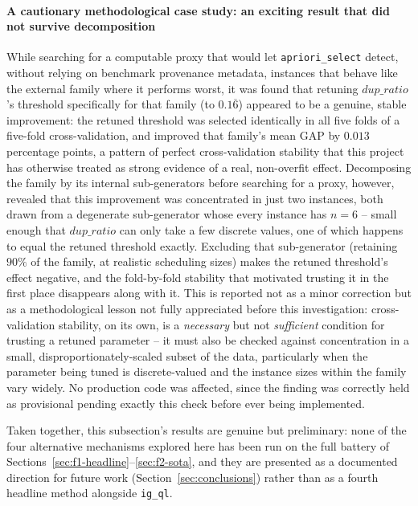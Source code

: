 \documentclass[final,3p,times,11pt,authoryear]{elsarticle}
\begin{document}
\paragraph{A cautionary methodological case study: an exciting result
that did not survive decomposition} While searching for a computable
proxy that would let \texttt{apriori\_select} detect, without relying
on benchmark provenance metadata, instances that behave like the
external family where it performs worst, it was found that retuning
$\mathit{dup\_ratio}$'s threshold specifically for that family
(to $0.1\overline{6}$) appeared to be a genuine, stable improvement:
the retuned threshold was selected identically in all five folds of a
five-fold cross-validation, and improved that family's mean GAP by
$0.013$ percentage points, a pattern of perfect cross-validation
stability that this project has otherwise treated as strong evidence
of a real, non-overfit effect. Decomposing the family by its internal
sub-generators before searching for a proxy, however, revealed that
this improvement was concentrated in just two instances, both drawn
from a degenerate sub-generator whose every instance has $n=6$ --
small enough that $\mathit{dup\_ratio}$ can only take a few discrete
values, one of which happens to equal the retuned threshold exactly.
Excluding that sub-generator (retaining $90\%$ of the family, at
realistic scheduling sizes) makes the retuned threshold's effect
negative, and the fold-by-fold stability that motivated trusting it
in the first place disappears along with it. This is reported not as a
minor correction but as a methodological lesson not fully
appreciated before this investigation: cross-validation stability, on
its own, is a \emph{necessary} but not \emph{sufficient} condition for
trusting a retuned parameter -- it must also be checked against
concentration in a small, disproportionately-scaled subset of the
data, particularly when the parameter being tuned is discrete-valued
and the instance sizes within the family vary widely. No production
code was affected, since the finding was correctly held as provisional
pending exactly this check before ever being implemented.

Taken together, this subsection's results are genuine but preliminary:
none of the four alternative mechanisms explored here has been run on
the full battery of Sections~\ref{sec:f1-headline}--\ref{sec:f2-sota},
and they are presented as a documented direction for future work
(Section~\ref{sec:conclusions}) rather than as a fourth headline
method alongside \texttt{ig\_ql}.
\end{document}
